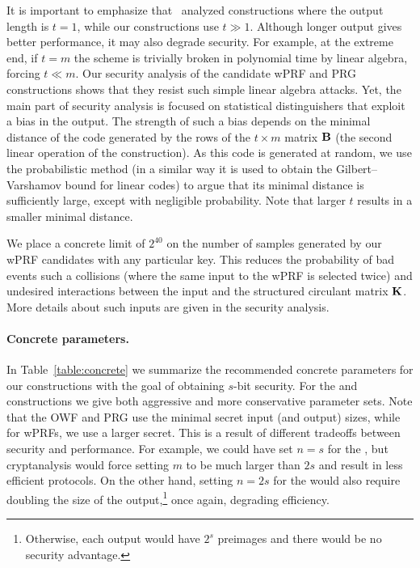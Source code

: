 It is important to emphasize that~\cite{cheon2020-adventures} analyzed constructions where the output length is $t=1$,
while our constructions use $t \gg 1$.
Although longer output gives better performance, it may also degrade security.
For example, at the extreme end, if $t = m$ the scheme is trivially broken in polynomial time by linear algebra,
forcing $t \ll m$.
Our security analysis of the candidate wPRF and PRG constructions shows that they resist such simple linear algebra attacks.
Yet, the main part of security analysis is focused on statistical distinguishers that exploit a bias in the output.
The strength of such a bias depends on the minimal distance of the
code generated by the rows of the $t \times m$ matrix $\mat{B}$
(the second linear operation of the construction).
As this code is generated at random, we use the probabilistic method
(in a similar way it is used to obtain the Gilbert–Varshamov bound for linear codes)
to argue that its minimal distance is sufficiently large, except with negligible probability.
Note that larger $t$ results in a smaller minimal distance.

We place a concrete limit of $2^{40}$ on the number of samples generated by our wPRF candidates
with any particular key. This reduces the probability of bad events such a collisions
(where the same input to the wPRF is selected twice) and undesired interactions
between the input and the structured circulant matrix $\mat{K}$.
More details about such inputs are given in the security analysis.


\paragraph{Concrete parameters.}
In Table~\ref{table:concrete} we summarize the recommended
concrete parameters for our constructions
with the goal of obtaining $s$-bit security. For the \ttOWF and \ttwPRF constructions
we give both aggressive and more conservative parameter sets.
Note that the OWF and PRG use the minimal secret input (and output)
sizes, while for wPRFs, we use a larger secret.
This is a result of different tradeoffs between security and performance.
For example, we could have set $n = s$ for the \ttwPRF, but cryptanalysis would
force setting $m$ to be much larger than $2s$ and result in less efficient protocols.
On the other hand, setting $n = 2s$ for the \ttOWF would also require
doubling the size of the output,\footnote{
Otherwise, each output would have $2^s$ preimages and there would be no security advantage.}
once again, degrading efficiency.

